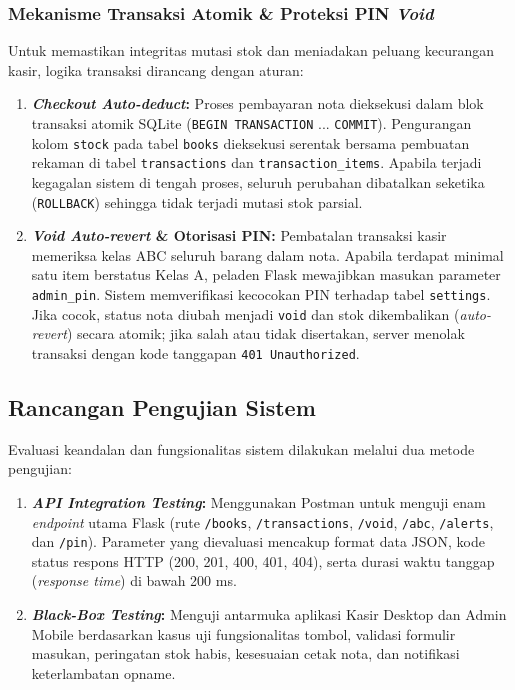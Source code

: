 \documentclass[11pt, a4paper]{article}
\begin{document}
\subsubsection{Mekanisme Transaksi Atomik \& Proteksi PIN \textit{Void}}
Untuk memastikan integritas mutasi stok dan meniadakan peluang kecurangan kasir, logika transaksi dirancang dengan aturan:
\begin{enumerate}[label=\alph*.]
    \item \textbf{\textit{Checkout Auto-deduct}:} Proses pembayaran nota dieksekusi dalam blok transaksi atomik SQLite (\texttt{BEGIN TRANSACTION} ... \texttt{COMMIT}). Pengurangan kolom \texttt{stock} pada tabel \texttt{books} dieksekusi serentak bersama pembuatan rekaman di tabel \texttt{transactions} dan \texttt{transaction\_items}. Apabila terjadi kegagalan sistem di tengah proses, seluruh perubahan dibatalkan seketika (\texttt{ROLLBACK}) sehingga tidak terjadi mutasi stok parsial.
    \item \textbf{\textit{Void Auto-revert} \& Otorisasi PIN:} Pembatalan transaksi kasir memeriksa kelas ABC seluruh barang dalam nota. Apabila terdapat minimal satu item berstatus Kelas A, peladen Flask mewajibkan masukan parameter \texttt{admin\_pin}. Sistem memverifikasi kecocokan PIN terhadap tabel \texttt{settings}. Jika cocok, status nota diubah menjadi \texttt{void} dan stok dikembalikan (\textit{auto-revert}) secara atomik; jika salah atau tidak disertakan, server menolak transaksi dengan kode tanggapan \texttt{401 Unauthorized}.
\end{enumerate}

\subsection{Rancangan Pengujian Sistem}
Evaluasi keandalan dan fungsionalitas sistem dilakukan melalui dua metode pengujian:
\begin{enumerate}[label=\arabic*.]
    \item \textbf{\textit{API Integration Testing}:} Menggunakan Postman untuk menguji enam \textit{endpoint} utama Flask (rute \texttt{/books}, \texttt{/transactions}, \texttt{/void}, \texttt{/abc}, \texttt{/alerts}, dan \texttt{/pin}). Parameter yang dievaluasi mencakup format data JSON, kode status respons HTTP (200, 201, 400, 401, 404), serta durasi waktu tanggap (\textit{response time}) di bawah 200 ms.
    \item \textbf{\textit{Black-Box Testing}:} Menguji antarmuka aplikasi Kasir Desktop dan Admin Mobile berdasarkan kasus uji fungsionalitas tombol, validasi formulir masukan, peringatan stok habis, kesesuaian cetak nota, dan notifikasi keterlambatan opname.
\end{enumerate}
\end{document}
